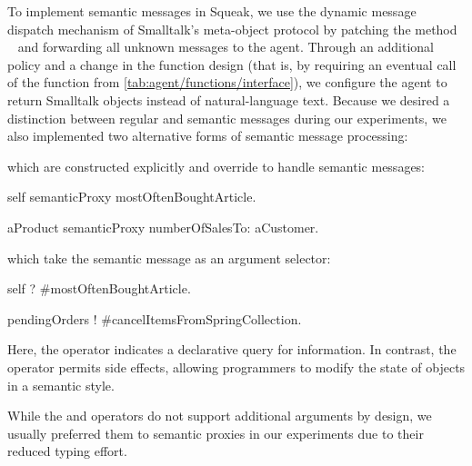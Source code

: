 To implement semantic messages in Squeak, we use the dynamic message dispatch mechanism of Smalltalk's meta-object protocol by patching the method ~\cite[sec.~5.11]{ingalls2020evolution} and forwarding all unknown messages to the agent.
Through an additional policy and a change in the function design (that is, by requiring an eventual call of the  function from \cref{tab:agent/functions/interface}), we configure the agent to return Smalltalk objects instead of natural-language text.
Because we desired a distinction between regular and semantic messages during our experiments, we also implemented two alternative forms of semantic message processing:
\begin{description}[noextralabelsep]
	\item[Semantic proxies,] which are constructed explicitly and override  to handle semantic messages:
	\begin{multicode}
		self semanticProxy mostOftenBoughtArticle.

		aProduct semanticProxy numberOfSalesTo: aCustomer.
	\end{multicode}
	\item[The \code{?} and \code{!} operators,] which take the semantic message as an argument selector:
	\begin{multicode}
		self ? \#mostOftenBoughtArticle.

		pendingOrders ! \#cancelItemsFromSpringCollection.
	\end{multicode}
	Here, the  operator indicates a declarative query for information.
	In contrast, the \code{!} operator permits side effects, allowing programmers to modify the state of objects in a semantic style.
\end{description}
While the  and \code{!} operators do not support additional arguments by design, we usually preferred them to semantic proxies in our experiments due to their reduced typing effort.
